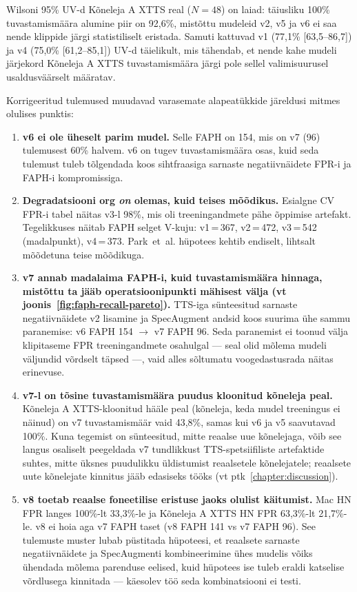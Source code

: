 Wilsoni 95\% UV-d Kõneleja A XTTS real ($N=48$) on laiad: täiusliku 100\% tuvastamismäära alumine piir on 92,6\%, mistõttu mudeleid v2, v5 ja v6 ei saa nende klippide järgi statistiliselt eristada. Samuti kattuvad v1 (77,1\% [63,5--86,7]) ja v4 (75,0\% [61,2--85,1]) UV-d täielikult, mis tähendab, et nende kahe mudeli järjekord Kõneleja A XTTS tuvastamismäära järgi pole sellel valimisuurusel usaldusväärselt määratav.

Korrigeeritud tulemused muudavad varasemate alapeatükkide järeldusi mitmes olulises punktis:

\begin{enumerate}
    \item \textbf{v6 ei ole üheselt parim mudel.} Selle FAPH on 154, mis on v7 (96) tulemusest 60\% halvem. v6 on tugev tuvastamismäära osas, kuid seda tulemust tuleb tõlgendada koos sihtfraasiga sarnaste negatiivnäidete FPR-i ja FAPH-i kompromissiga.
    \item \textbf{Degradatsiooni org \emph{on} olemas, kuid teises mõõdikus.} Esialgne CV FPR-i tabel näitas v3-l 98\%, mis oli treeningandmete pähe õppimise artefakt. Tegelikkuses näitab FAPH selget V-kuju: v1\,=\,367, v2\,=\,472, v3\,=\,542 (madalpunkt), v4\,=\,373. Park~et~al. \cite{park2024adversarial} hüpotees kehtib endiselt, lihtsalt mõõdetuna teise mõõdikuga.
    \item \textbf{v7 annab madalaima FAPH-i, kuid tuvastamismäära hinnaga, mistõttu ta jääb operatsioonipunkti mähisest välja (vt joonis~\ref{fig:faph-recall-pareto}).} TTS-iga sünteesitud sarnaste negatiivnäidete v2 lisamine ja SpecAugment andsid koos suurima ühe sammu paranemise: v6 FAPH 154 $\rightarrow$ v7 FAPH 96. Seda paranemist ei toonud välja klipitaseme FPR treeningandmete osahulgal --- seal olid mõlema mudeli väljundid võrdselt täpsed ---, vaid alles sõltumatu voogedastusrada näitas erinevuse.
    \item \textbf{v7-l on tõsine tuvastamismäära puudus kloonitud kõneleja peal.} Kõneleja A XTTS-kloonitud hääle peal (kõneleja, keda mudel treeningus ei näinud) on v7 tuvastamismäär vaid 43,8\%, samas kui v6 ja v5 saavutavad 100\%. Kuna tegemist on sünteesitud, mitte reaalse uue kõnelejaga, võib see langus osaliselt peegeldada v7 tundlikkust TTS-spetsiifiliste artefaktide suhtes, mitte üksnes puudulikku üldistumist reaalsetele kõnelejatele; reaalsete uute kõnelejate kinnitus jääb edasiseks tööks (vt ptk~\ref{chapter:discussion}).
    \item \textbf{v8 toetab reaalse foneetilise eristuse jaoks olulist käitumist.} Mac HN FPR langes 100\%-lt 33,3\%-le ja Kõneleja A XTTS HN FPR 63,3\%-lt 21,7\%-le. v8 ei hoia aga v7 FAPH taset (v8 FAPH 141 vs v7 FAPH 96). See tulemuste muster lubab püstitada hüpoteesi, et reaalsete sarnaste negatiivnäidete ja SpecAugmenti kombineerimine ühes mudelis võiks ühendada mõlema parenduse eelised, kuid hüpotees ise tuleb eraldi katselise võrdlusega kinnitada --- käesolev töö seda kombinatsiooni ei testi.
\end{enumerate}

